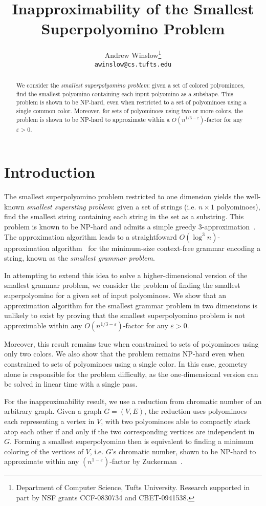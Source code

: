 \documentclass{article}
\author{Andrew Winslow\footnote{Department of Computer Science, Tufts University. Research supported in part by NSF grants CCF-0830734 and CBET-0941538.}\\
\texttt{awinslow@cs.tufts.edu}}
\title{Inapproximability of the Smallest Superpolyomino Problem}
\date{}
\newcommand{\ccNP}{\textrm{\textsc{NP}}}
\begin{document}
\maketitle

\begin{abstract}
We consider the \emph{smallest superpolyomino problem}: given a set of colored polyominoes, find the smallest polyomino containing each input polyomino as a subshape.
This problem is shown to be \ccNP-hard, even when restricted to a set of polyominoes using a single common color.
Moreover, for sets of polyominoes using two or more colors, the problem is shown to be \ccNP-hard to approximate within a $O(n^{1/3-\varepsilon})$-factor for any $\varepsilon > 0$. 
\end{abstract}

\section{Introduction}

The smallest superpolyomino problem restricted to one dimension yields the well-known \emph{smallest supersting problem}: given a set of strings (i.e. $n \times 1$ polyominoes), find the smallest string containing each string in the set as a substring. 
This problem is known to be \ccNP-hard and admits a simple greedy 3-approximation~\cite{Blum-1994}.
The approximation algorithm leads to a straightfoward $O(\log^3{n})$-approximation algorithm~\cite{Charikar-2005} for the minimum-size context-free grammar encoding a string, known as the \emph{smallest grammar problem}.

In attempting to extend this idea to solve a higher-dimensional version of the smallest grammar problem, we consider the problem of finding the smallest superpolyomino for a given set of input polyominoes.
We show that an approximation algorithm for the smallest grammar problem in two dimensions is unlikely to exist by proving that the smallest superpolyomino problem is not approximable within any $O(n^{1/3-\varepsilon})$-factor for any $\varepsilon > 0$.

Moreover, this result remains true when constrained to sets of polyominoes using only two colors.
We also show that the problem remains \ccNP-hard even when constrained to sets of polyominoes using a single color.
In this case, geometry alone is responsible for the problem difficulty, as the one-dimensional version can be solved in linear time with a single pass.

For the inapproximability result, we use a reduction from chromatic number of an arbitrary graph.
Given a graph $G = (V, E)$, the reduction uses polyominoes each representing a vertex in $V$, with two polyominoes able to compactly stack atop each other if and only if the two corresponding vertices are independent in $G$.
Forming a smallest superpolyomino then is equivalent to finding a minimum coloring of the vertices of $V$, i.e. $G$'s chromatic number, shown to be \ccNP-hard to approximate within any $(n^{1-\varepsilon})$-factor by Zuckerman~\cite{Zuckerman-2007}.
\end{document}
